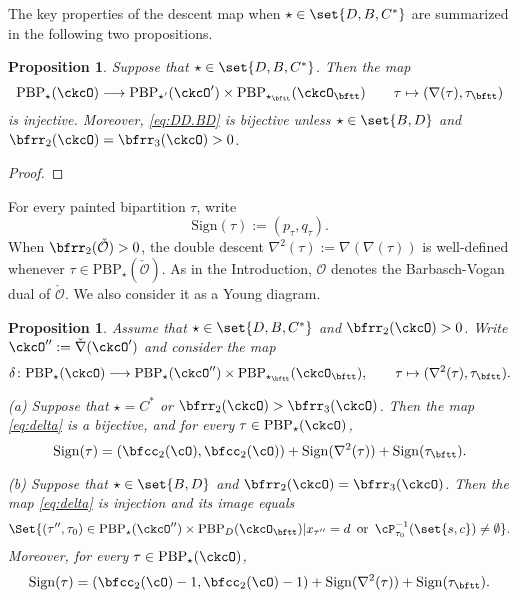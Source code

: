 \documentclass[12pt,a4paper]{amsart}
\newcommand{\CO}{{\mathcal {O}}}
\def\DD{\nabla}
\numberwithin{equation}{section}
\newtheorem{prop}[thm]{Proposition}
\theoremstyle{remark}
\def\ssign{\mathrm{Sign}}
\def\ckcOp{\ckcO^{\prime}}
\def\ckcOpp{\ckcO^{\prime\prime}}
\def\ckDD{{\check\DD}}
\def\PBP{\mathrm{PBP}}
\begin{document}
\medskip

The key properties of the descent map when $\star\in \set{D,B,C^*}$ are summarized in the following two propositions.

\begin{prop}\label{prop:DD.BD}
Suppose that $\star \in \set{D,B,C^*}$.
Then the map
\begin{equation}\label{eq:DD.BD}
   \PBP_\star(\ckcO)\longrightarrow
   \PBP_{\star'}(\ckcOp)\times \PBP_{\star_\bftt}(\ckcO_\bftt)
   \qquad \tau \mapsto (\DD(\tau), \tau_\bftt)
\end{equation}
is injective. Moreover, \eqref{eq:DD.BD} is bijective
unless $\star\in \set{B,D}$ and $\bfrr_2(\ckcO)=\bfrr_3(\ckcO)>0$.
\end{prop}
\begin{proof}

\end{proof}



For every painted bipartition $\tau$, write
\[
  \ssign(\tau):=(p_\tau, q_\tau).
\]
When $\bfrr_2(\check \CO)>0$, the double descent $\nabla^2(\tau):=\nabla(\nabla(\tau))$ is well-defined whenever $\tau\in \mathrm{PBP}_\star(\check \CO)$.
As in the Introduction, $\CO$ denotes the Barbasch-Vogan dual of $\check \CO$. We also consider it as a Young diagram.

\begin{prop}\label{prop:delta}
Assume that $\star \in \set{D,B,C^*}$ and $\bfrr_2(\ckcO)>0$. Write $\ckcOpp := \ckDD(\ckcO')$ and consider the map
\begin{equation}\label{eq:delta}
  \delta  \colon \PBP_\star(\ckcO)\longrightarrow
    \PBP_\star(\ckcOpp)\times \PBP_{\star_\bftt}(\ckcO_\bftt),
    \qquad \tau \mapsto (\DD^2(\tau),\tau_\bftt).
\end{equation}

\noindent (a) Suppose that
$\star = C^*$ or $\bfrr_2(\ckcO)>\bfrr_3(\ckcO)$. Then the map \eqref{eq:delta} is a bijective, and for every $\tau\in  \PBP_\star(\ckcO) $,
\[
\ssign(\tau)
=(\bfcc_2(\cO),\bfcc_2(\cO))+\ssign(\DD^2(\tau))+\ssign(\tau_\bftt).
\]

\noindent (b) Suppose that  $\star \in \set{B,D}$ and $\bfrr_2(\ckcO)=\bfrr_3(\ckcO)$. Then the map \eqref{eq:delta} is  injection and its  image equals
    \[
    \Set{ (\tau'',\tau_0)  \in \PBP_\star(\ckcOpp)\times \PBP_D(\ckcO_\bftt)  |
    x_{\tau''} = d\, \text{ or } \,
    \cP_{\tau_0}^{-1}(\set{s,c})\neq \emptyset }.
    \]
    Moreover,  for every $\tau\in  \PBP_\star(\ckcO) $,
\[
\ssign(\tau)
=(\bfcc_2(\cO)-1,\bfcc_2(\cO)-1)+\ssign(\DD^2(\tau))+\ssign(\tau_\bftt).
\]
\end{prop}
\end{document}
